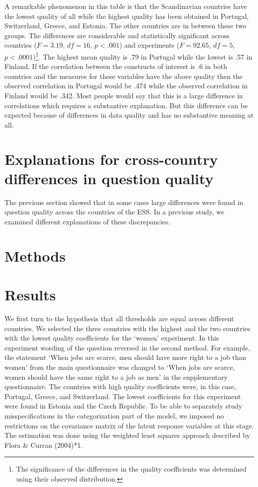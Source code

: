 \documentclass[a4paper,12pt]{article}
\begin{document}
A remarkable phenomenon in this table is that the Scandinavian countries have the lowest quality of all while the highest quality has been obtained in Portugal, Switzerland, Greece, and Estonia. The other countries are in between these two groups. 
The differences are considerable and statistically significant across countries ($F=3.19$, $df=16$, $p<.001$) and experiments ($F=92.65$, $df=5$, $p<.0001$)\footnote{The significance of the differences in the quality coefficients was determined using their observed distribution.}. The highest mean quality is .79 in Portugal while the lowest is .57 in Finland. If the correlation between the constructs of interest is .6 in both countries and the measures for these variables have the above quality then the observed correlation in Portugal would be .474 while the observed correlation in Finland would be .342. Most people would say that this is a large difference in correlations which requires a substantive explanation. But this difference can be expected because of differences in data quality and has no substantive meaning at all.

\section{Explanations for cross-country differences in question quality}

The previous section showed that in some cases large differences were found in question quality across the countries of the ESS. In a previous study, we examined different explanations of these discrepancies.


\section{Methods}


\section{Results}

We first turn to the hypothesis that all thresholds are equal across different countries. We selected the three countries with the highest and the two countries with the lowest quality coefficients for the `women' experiment. In this experiment wording of the question reversed in the second method. For example, the statement `When jobs are scarce, men should have more right to a job than women' from the main questionnaire was changed to `When jobs are scarce, women should have the same right to a job as men' in the supplementary questionnaire. The countries with high quality coefficients were, in this case, Portugal, Greece, and Switzerland. The lowest coefficients for this experiment were found in Estonia and the Czech Republic. To be able to separately study misspecifications in the categorization part of the model, we imposed no restrictions on the covariance matrix of the latent response variables at this stage. The estimation was done using the weighted least squares approach described by Flora \& Curran (2004)*1.
\end{document}
